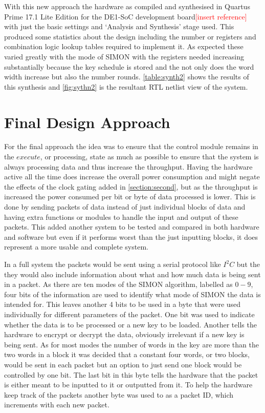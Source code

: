 \documentclass[12pt,twoside,a4paper]{report}
\begin{document}
	With this new approach the hardware as compiled and synthesised in Quartus Prime 17.1 Lite Edition for the DE1-SoC development board\textcolor{red}{[insert reference]} with just the basic settings and `Analysis and Synthesis' stage used. This produced some statistics about the design including the number or registers and combination logic lookup tables required to implement it. As expected these varied greatly with the mode of SIMON with the registers needed increasing substantially because the key schedule is stored and the not only does the word width increase but also the number rounds. \autoref{table:synth2} shows the results of this synthesis and \autoref{fig:sythn2} is the resultant RTL netlist view of the system.
	    
	\chapter{Final Design Approach}
	\label{chapter:FINAL}
	For the final approach the idea was to ensure that the control module remains in the $execute$, or processing, state as much as possible to ensure that the system is always processing data and thus increase the throughput. Having the hardware active all the time does increase the overall power consumption and might negate the effects of the clock gating added in \autoref{section:second}, but as the throughput is increased the power consumed per bit or byte of data processed is lower. This is done by sending packets of data instead of just individual blocks of data and having extra functions or modules to handle the input and output of these packets. This added another system to be tested and compared in both hardware and software but even if it performs worst than the just inputting blocks, it does represent a more usable and complete system.
    
	In a full system the packets would be sent using a serial protocol like $I^2C$ but the they would also include information about what and how much data is being sent in a packet. As there are ten modes of the SIMON algorithm, labelled as $0 - 9$, four bits of the information are used to identify what mode of SIMON the data is intended for. This leaves another 4 bits to be used in a byte that were used individually for different parameters of the packet. One bit was used to indicate whether the data is to be processed or a new key to be loaded. Another tells the hardware to encrypt or decrypt the data, obviously irrelevant if a new key is being sent. As for most modes the number of words in the key are more than the two words in a block it was decided that a constant four words, or two blocks, would be sent in each packet but an option to just send one block would be controlled by one bit. The last bit in this byte tells the hardware that the packet is either meant to be inputted to it or outputted from it. To help the hardware keep track of the packets another byte was used to as a packet ID, which increments with each new packet.
    
\end{document}
